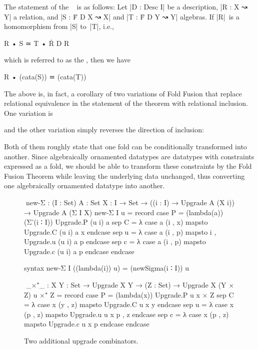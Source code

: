 The statement of the ~\cite[Section~6.2]{Bird-AoP} is as follows:
Let |D : Desc I| be a description, |R : X ↝ Y| a relation, and |S : Ḟ D X ↝ X| and |T : Ḟ D Y ↝ Y| algebras.
If |R|~is a homomorphism from |S| to~|T|, i.e.,
\begin{code}
R • S ≃ T • Ṙ D R
\end{code}
which is referred to as the , then we have
\begin{code}
R • (cata(S)) ≃ (cata(T))
\end{code}
The above is, in fact, a corollary of two variations of Fold Fusion that replace relational equivalence in the statement of the theorem with relational inclusion.
One variation is
and the other variation simply reverses the direction of inclusion:
Both of them roughly state that one fold can be conditionally transformed into another.
Since algebraically ornamented datatypes are datatypes with constraints expressed as a fold, we should be able to transform these constraints by the Fold Fusion Theorem while leaving the underlying data unchanged, thus converting one algebraically ornamented datatype into another.

\begin{figure}
\codefigure
\begin{code}
^^^new-Σ :  (I : Set) {A : Set} {X : I → Set} →
            ((i : I) → Upgrade A (X i)) → Upgrade A (Σ I X)
new-Σ I u = record  case  P  = (lambda(a)) (Σ'(i ∶ I)) Upgrade.P (u i) a
                    sep   C  = λ case a (i , x) mapsto Upgrade.C (u i) a x      endcase
                    sep   u  = λ case a (i , p) mapsto i , Upgrade.u (u i) a p  endcase
                    sep   c  = λ case a (i , p) mapsto Upgrade.c (u i) a p      endcase endcase

syntax new-Σ I ((lambda(i)) u) = (newSigma(i ∶ I)) u

^^^_×⁺_ : {X Y : Set} → Upgrade X Y → (Z : Set) → Upgrade X (Y × Z)
u ×⁺ Z = record  case  P  = (lambda(x)) Upgrade.P u x × Z
                 sep   C  = λ case x (y , z) mapsto Upgrade.C u x y      endcase
                 sep   u  = λ case x (p , z) mapsto Upgrade.u u x p , z  endcase
                 sep   c  = λ case x (p , z) mapsto Upgrade.c u x p      endcase endcase
\end{code}
\caption{Two additional upgrade combinators.}
\label{fig:fusion-upgrade-combinators}
\end{figure}

